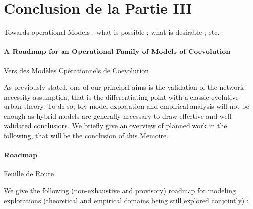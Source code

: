 





\chapter*{Conclusion de la Partie III}










Towards operational Models : what is possible ; what is desirable ; etc.


\subsubsection*{A Roadmap for an Operational Family of Models of Coevolution}{Vers des Modèles Opérationnels de Coevolution} %


As previously stated, one of our principal aims is the validation of the network necessity assumption, that is the differentiating point with a classic evolutive urban theory. To do so, toy-model exploration and empirical analysis will not be enough as hybrid models are generally necessary to draw effective and well validated conclusions. We briefly give an overview of planned work in the following, that will be the conclusion of this Memoire.












\subsubsection*{Roadmap}{Feuille de Route}


We give the following (non-exhaustive and provisory) roadmap for modeling explorations (theoretical and empirical domains being still explored conjointly) :

